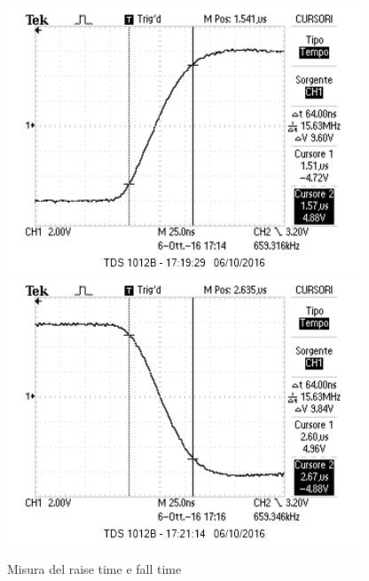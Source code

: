 \documentclass[10pt,a4paper]{article}
\begin{document}
\begin{figure}[h]
	\centering
	\includegraphics[scale=0.6]{../Oscilloscopio/raise_time.jpg}
	\includegraphics[scale=0.6]{../Oscilloscopio/fall_time.jpg}
	\caption{Misura del raise time e fall time}
	\label{f:raise}
\end{figure}
\end{document}
